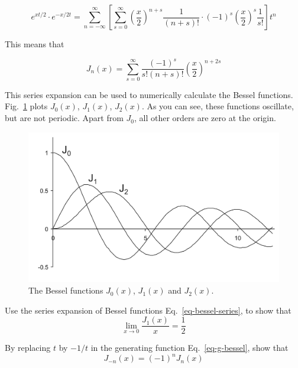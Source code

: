 \begin{equation}
e^{xt/2} \cdot e^{-x/2t} = \sum_{n = -\infty}^{\infty} \left[ \sum_{s = 0}^{\infty} {\left(\frac{x}{2}\right)}^{n+s} \frac{1}{(n+s)!} \cdot (-1)^s {\left(\frac{x}{2}\right)}^{s} \frac{1}{s!} \right] t^n
\end{equation} 

This means that

\begin{equation}
J_n(x) = \sum_{s = 0}^{\infty} \frac {{(-1)}^s}{s!(n+s)!} {\left(\frac{x}{2}\right)}^{n+2s} \label{eq-bessel-series}
\end{equation} 

This series expansion can be used to numerically calculate the Bessel functions. Fig.~\ref{fig-bessel-J} plots $J_0(x)$, $J_1(x)$, $J_2(x)$. As you can see, these functions oscillate, but are not periodic. Apart from $J_0$, all other orders are zero at the origin.

\begin{figure}
\centering
\includegraphics{bessel/figures/j}
\caption{The Bessel functions $J_0(x)$, $J_1(x)$ and $J_2(x)$.}
\label{fig-bessel-J}
\end{figure}

\pagebreak 


\begin{exer}
Use the series expansion of Bessel functions Eq.~\ref{eq-bessel-series}, to show that
$$\lim_{x \to 0} \frac{J_1(x)}{x}= \frac{1}{2}$$
\end{exer}

\begin{exer}
By replacing $t$ by $-1/t$ in the generating function Eq.~\ref{eq-g-bessel}, show that
$$J_{-n}(x)=(-1)^nJ _n(x)$$
\end{exer}

